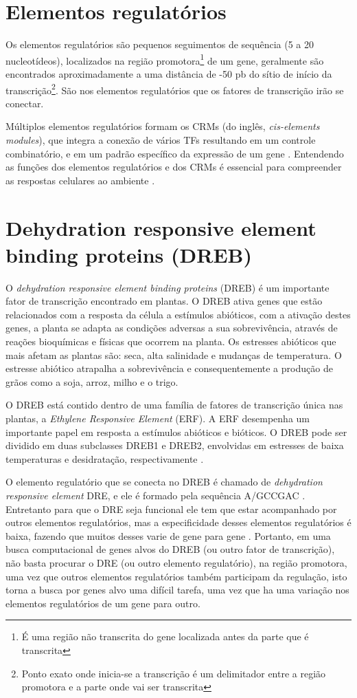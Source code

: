 \section{Elementos regulatórios}

Os elementos regulatórios são pequenos seguimentos de sequência (5 a 20 nucleotídeos), localizados na região promotora\footnote{É uma região não transcrita do gene localizada antes da parte que é transcrita} de um gene, geralmente são encontrados aproximadamente a uma distância de -50 pb do sítio de início da transcrição\footnote{Ponto exato onde inicia-se a transcrição é um delimitador entre a região promotora e a parte onde vai ser transcrita}. São nos elementos regulatórios que os fatores de transcrição irão se conectar. 

Múltiplos elementos regulatórios formam os CRMs (do inglês, \textit{cis-elements modules}), que integra a conexão de vários TFs resultando em um controle combinatório, e em um padrão específico da expressão de um gene \cite{Priest2009}. Entendendo as funções dos elementos regulatórios e dos CRMs é essencial para compreender as respostas celulares ao ambiente \cite{Priest2009}.

\section{Dehydration responsive element binding proteins (DREB)}

O \textit{dehydration responsive element binding proteins} (DREB) é um importante fator de transcrição encontrado em plantas. O DREB ativa genes que estão relacionados com a resposta da célula a estímulos abióticos, com a ativação destes genes, a planta se adapta as condições adversas a sua sobrevivência, através de reações bioquímicas e físicas que ocorrem na planta. Os estresses abióticos que mais afetam as plantas são: seca, alta salinidade e mudanças de temperatura. O estresse abiótico atrapalha a sobrevivência e consequentemente a produção de grãos como a soja, arroz, milho e o trigo.

O DREB está contido dentro de uma família de fatores de transcrição única nas plantas, a \textit{Ethylene Responsive Element} (ERF). A ERF desempenha um importante papel em resposta a estímulos abióticos e bióticos. O DREB pode ser dividido em duas subclasses DREB1 e DREB2, envolvidas em estresses de baixa temperaturas e desidratação, respectivamente \cite{Chen2007GmDREB2}.

O elemento regulatório que se conecta no DREB é chamado de \textit{dehydration responsive element} DRE, e ele é formado pela sequência A/GCCGAC \cite{Nakashima2009}. Entretanto para que o DRE seja funcional ele tem que estar acompanhado por outros elementos regulatórios, mas a especificidade desses elementos regulatórios é baixa, fazendo que muitos desses varie de gene para gene \cite{Zhang2005}. Portanto, em uma busca computacional de genes alvos do DREB (ou outro fator de transcrição), não basta procurar o DRE (ou outro elemento regulatório), na região promotora, uma vez que outros elementos regulatórios também participam da regulação, isto torna a busca por genes alvo uma difícil tarefa, uma vez que ha uma variação nos elementos regulatórios de um gene para outro.

